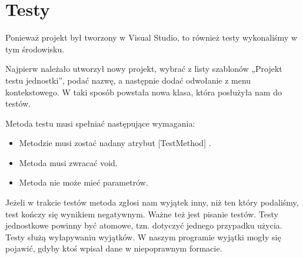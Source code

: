 \documentclass{article}
\begin{document}
	\section{Testy}

	Ponieważ projekt był tworzony w Visual Studio, to również testy wykonaliśmy w tym środowisku.
	
	Najpierw należało utworzył nowy projekt, wybrać z listy szablonów „Projekt testu jednostki”, podać nazwę, a następnie dodać odwołanie z menu kontekstowego. W taki sposób powstała nowa klasa, która posłużyła nam do testów.
	
	Metoda testu musi spełniać następujące wymagania:
	\begin{itemize}
	\item 	Metodzie musi zostać nadany atrybut [TestMethod] .
	\item 	Metoda musi zwracać void.
	\item	Metoda nie może mieć parametrów.
	\end{itemize}
	
	Jeżeli w trakcie testów metoda zgłosi nam wyjątek inny, niż ten który podaliśmy, test kończy się wynikiem negatywnym.
	Ważne też jest pisanie testów. Testy jednostkowe powinny być atomowe, tzn. dotyczyć jednego przypadku użycia.
	Testy służą wyłapywaniu wyjątków. W naszym programie wyjątki mogły się pojawić, gdyby ktoś wpisał dane w niepoprawnym formacie.
	
\end{document}
